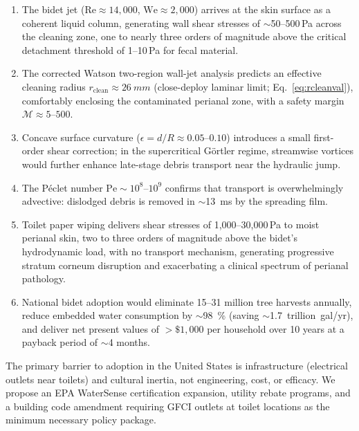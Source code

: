 \documentclass[aps,prfluids,reprint,amsmath,amssymb,floatfix]{revtex4-2}
\newcommand{\Rey}{\mathrm{Re}}
\newcommand{\We}{\mathrm{We}}
\newcommand{\Pe}{\mathrm{Pe}}
\begin{document}
\begin{enumerate}[leftmargin=*]
    \item The bidet jet ($\Rey \approx 14{,}000$, $\We \approx 2{,}000$)
    arrives at the skin surface as a coherent liquid column, generating
    wall shear stresses of $\sim$50--500\,Pa across the cleaning zone, one
    to nearly three orders of magnitude above the critical detachment
    threshold of 1--10\,Pa for fecal material.
    \item The corrected Watson two-region wall-jet analysis predicts an
    effective cleaning radius $r_\mathrm{clean} \approx \SI{26}{mm}$
    (close-deploy laminar limit; Eq.~\eqref{eq:rcleanval}),
    comfortably enclosing the contaminated perianal zone, with a safety
    margin $\mathcal{M} \approx 5$--$500$.
    \item Concave surface curvature ($\epsilon = d/R \approx 0.05$--$0.10$)
    introduces a small first-order shear correction; in the supercritical
    G\"ortler regime, streamwise vortices would further enhance late-stage
    debris transport near the hydraulic jump.
    \item The P\'{e}clet number $\Pe \sim 10^{8}$--$10^{9}$ confirms that
    transport is overwhelmingly advective: dislodged debris is removed in
    $\sim$\SI{13}{ms} by the spreading film.
    \item Toilet paper wiping delivers shear stresses of 1{,}000--30{,}000\,Pa
    to moist perianal skin, two to three orders of magnitude above the
    bidet's hydrodynamic load, with no transport mechanism, generating
    progressive stratum corneum disruption and exacerbating a clinical
    spectrum of perianal pathology.
    \item National bidet adoption would eliminate 15--31 million tree
    harvests annually, reduce embedded water consumption by
    $\sim$\SI{98}{\percent} (saving $\sim$\SI{1.7}{trillion gal/yr}), and
    deliver net present values of $>\$1{,}000$ per household over 10 years
    at a payback period of $\sim$4 months.
\end{enumerate}

The primary barrier to adoption in the United States is infrastructure
(electrical outlets near toilets) and cultural inertia, not engineering,
cost, or efficacy. We propose an EPA WaterSense certification expansion,
utility rebate programs, and a building code amendment requiring GFCI outlets
at toilet locations as the minimum necessary policy package.
\end{document}
